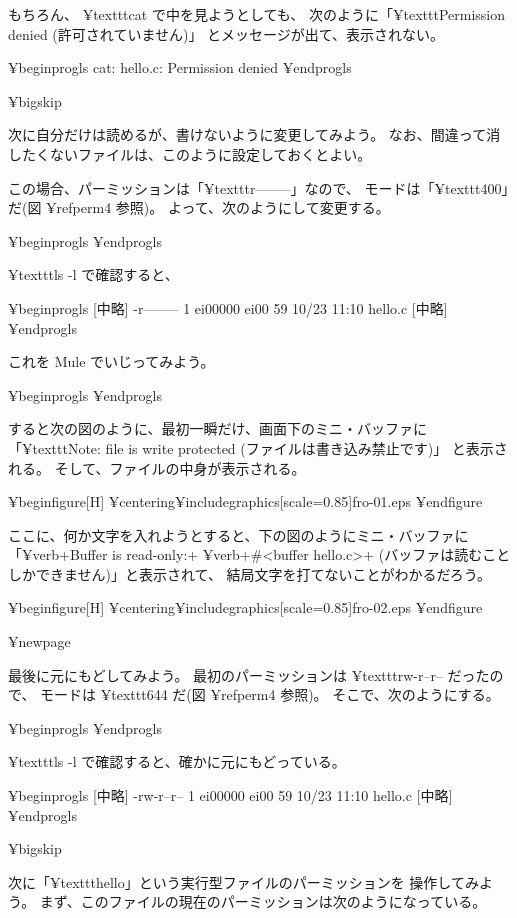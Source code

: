 もちろん、 ¥texttt{cat} で中を見ようとしても、
次のように「¥texttt{Permission denied} (許可されていません)」
とメッセージが出て、表示されない。

¥begin{progls}
cat: hello.c: Permission denied
%
¥end{progls}

¥bigskip

次に自分だけは読めるが、書けないように変更してみよう。
なお、間違って消したくないファイルは、このように設定しておくとよい。

この場合、パーミッションは「¥texttt{r--------}」なので、
モードは「¥texttt{400}」だ(図 ¥ref{perm4} 参照)。
よって、次のようにして変更する。

¥begin{progls}
%
¥end{progls}

¥texttt{ls -l} で確認すると、

¥begin{progls}
 [中略]
-r--------  1 ei00000  ei00    59  10/23 11:10  hello.c
 [中略]
% 
¥end{progls}

これを Mule でいじってみよう。

¥begin{progls}
%
¥end{progls}

すると次の図のように、最初一瞬だけ、画面下のミニ・バッファに
「¥texttt{Note: file is write protected} (ファイルは書き込み禁止です)」
と表示される。
そして、ファイルの中身が表示される。

¥begin{figure}[H]
¥centering{¥includegraphics[scale=0.85]{fro-01.eps}}
¥end{figure}

ここに、何か文字を入れようとすると、下の図のようにミニ・バッファに
「¥verb+Buffer is read-only:+
¥verb+#<buffer hello.c>+ (バッファは読むことしかできません)」と表示されて、
結局文字を打てないことがわかるだろう。

¥begin{figure}[H]
¥centering{¥includegraphics[scale=0.85]{fro-02.eps}}
¥end{figure}

¥newpage

最後に元にもどしてみよう。
最初のパーミッションは ¥texttt{rw-r--r--} だったので、
モードは ¥texttt{644} だ(図 ¥ref{perm4} 参照)。
そこで、次のようにする。

¥begin{progls}
%
¥end{progls}

¥texttt{ls -l} で確認すると、確かに元にもどっている。

¥begin{progls}
 [中略]
-rw-r--r--  1 ei00000  ei00    59  10/23 11:10  hello.c
 [中略]
%
¥end{progls}

¥bigskip

次に「¥texttt{hello}」という実行型ファイルのパーミッションを
操作してみよう。
まず、このファイルの現在のパーミッションは次のようになっている。


